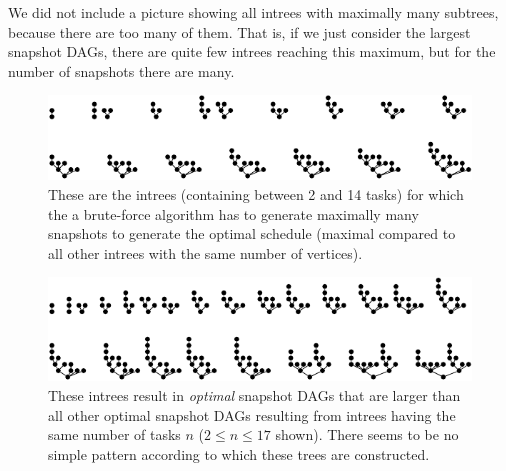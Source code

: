 We did not include a picture showing all intrees with maximally many subtrees, because there are too many of them. That is, if we just consider the largest snapshot DAGs, there are quite few intrees reaching this maximum, but for the number of snapshots there are many.

\begin{figure}[t]
  \centering
  \includegraphics[scale=1.4]{p3/max_unoptimized.pdf}
  \caption{These are the intrees (containing between 2 and 14 tasks) for which the a brute-force algorithm has to generate maximally many snapshots to generate the optimal schedule (maximal compared to all other intrees with the same number of vertices).}
  \label{fig:intrees-maximum-unoptimized-p3}
\end{figure}

\begin{figure}[t]
  \centering
  \includegraphics[scale=1.4]{p3/max_snapshot_dag.pdf}
  \caption{These intrees result in \emph{optimal} snapshot DAGs that are larger than all other optimal snapshot DAGs resulting from intrees having the same number of tasks $n$ ($2 \leq n \leq 17$ shown). There seems to be no simple pattern according to which these trees are constructed.}
  \label{fig:intrees-maximum-snapshot-dag-size-p3}
\end{figure}



